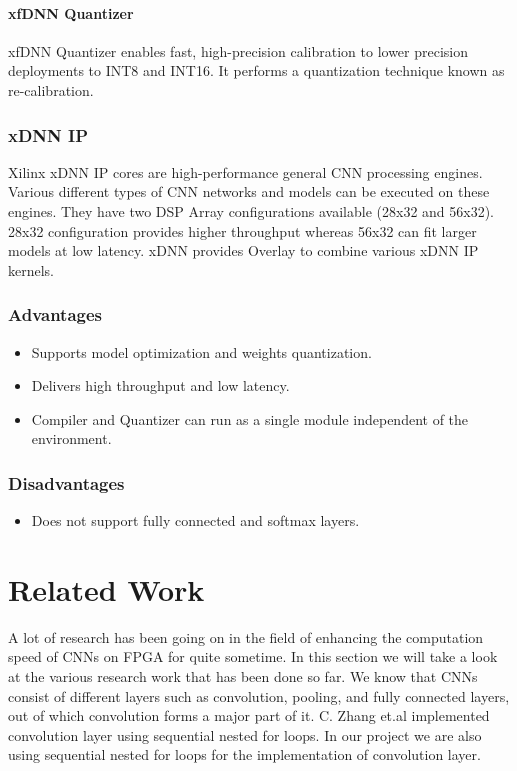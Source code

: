 \documentclass[titlepage]{report}
\begin{document}
\subsubsection{xfDNN Quantizer} 

xfDNN Quantizer enables fast, high-precision calibration to lower precision deployments to INT8 and INT16. It performs a quantization technique known as re-calibration.

\subsection{xDNN IP}
Xilinx xDNN IP cores are high-performance general CNN processing engines. Various different types of CNN networks and models can be executed on these engines. They have two DSP Array configurations available (28x32 and 56x32). 28x32 configuration provides higher throughput whereas 56x32 can fit larger models at low latency.
xDNN provides Overlay to combine various xDNN IP kernels.

\subsection{Advantages}
  
 \begin{itemize}
 \item Supports model optimization and weights quantization.
 \item Delivers high throughput and low latency.
 \item Compiler and Quantizer can run as a single module independent of the environment.

 \end{itemize}
 
\subsection{Disadvantages}
 \begin{itemize}
 \item Does not support fully connected and softmax layers.
 
 \end{itemize}


\chapter{Related Work}
 A lot of research has been going on in the field of enhancing the computation speed of CNNs on FPGA for quite sometime. In this section we will take a look at the various research work that has been done so far. We know that CNNs consist of different layers such as convolution, pooling, and fully connected layers, out of which convolution forms a major part of it. C. Zhang et.al implemented convolution layer using sequential nested for loops. In our project we are also using sequential nested for loops for the implementation of convolution layer. 
\end{document}
